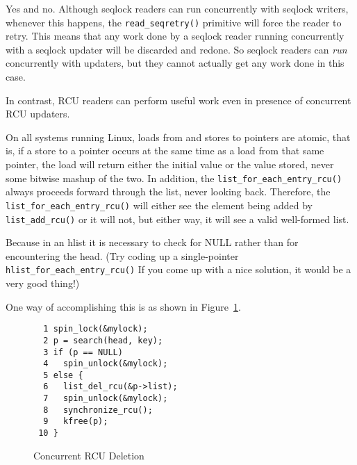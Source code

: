 
Yes and no.
Although seqlock readers can run concurrently with
seqlock writers, whenever this happens, the {\tt read\_seqretry()}
primitive will force the reader to retry.
This means that any work done by a seqlock reader running concurrently
with a seqlock updater will be discarded and redone.
So seqlock readers can \emph{run} concurrently with updaters,
but they cannot actually get any work done in this case.

In contrast, RCU readers can perform useful work even in presence
of concurrent RCU updaters.


On all systems running Linux, loads from and stores
to pointers are atomic, that is, if a store to a pointer occurs at
the same time as a load from that same pointer, the load will return
either the initial value or the value stored, never some bitwise mashup
of the two.
In addition, the {\tt list\_for\_each\_entry\_rcu()} always proceeds
forward through the list, never looking back.
Therefore, the {\tt list\_for\_each\_entry\_rcu()} will either see
the element being added by {\tt list\_add\_rcu()} or it will not,
but either way, it will see a valid well-formed list.


Because in an hlist it is necessary to check for
NULL rather than for encountering the head.
(Try coding up a single-pointer {\tt hlist\_for\_each\_entry\_rcu()}
If you come up with a nice solution, it would be a very good thing!)


One way of accomplishing this is as shown in
Figure~\ref{fig:defer:Concurrent RCU Deletion}.

\begin{figure}[htbp]
{ \centering
\begin{verbatim}
  1 spin_lock(&mylock);
  2 p = search(head, key);
  3 if (p == NULL)
  4   spin_unlock(&mylock);
  5 else {
  6   list_del_rcu(&p->list);
  7   spin_unlock(&mylock);
  8   synchronize_rcu();
  9   kfree(p);
 10 }
\end{verbatim}
}
\caption{Concurrent RCU Deletion}
\label{fig:defer:Concurrent RCU Deletion}
\end{figure}

